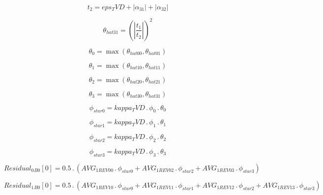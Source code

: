 \documentclass{article}
\begin{document}
\begin{dmath}t_{2} = eps_TVD + \left|{\alpha_{31}}\right| + \left|{\alpha_{32}}\right|\end{dmath}

\begin{dmath}\theta_{hat 31} = \left(\left|{\frac{t_{1}}{t_{2}}}\right| \right)^{2}\end{dmath}

\begin{dmath}\theta_{0} = \max\left(\theta_{hat 00}, \theta_{hat 01}\right)\end{dmath}

\begin{dmath}\theta_{1} = \max\left(\theta_{hat 10}, \theta_{hat 11}\right)\end{dmath}

\begin{dmath}\theta_{2} = \max\left(\theta_{hat 20}, \theta_{hat 21}\right)\end{dmath}

\begin{dmath}\theta_{3} = \max\left(\theta_{hat 30}, \theta_{hat 31}\right)\end{dmath}

\begin{dmath}\phi_{star 0} = kappa_TVD \,.\, \phi_{0} \,.\, \theta_{0}\end{dmath}

\begin{dmath}\phi_{star 1} = kappa_TVD \,.\, \phi_{1} \,.\, \theta_{1}\end{dmath}

\begin{dmath}\phi_{star 2} = kappa_TVD \,.\, \phi_{2} \,.\, \theta_{2}\end{dmath}

\begin{dmath}\phi_{star 3} = kappa_TVD \,.\, \phi_{3} \,.\, \theta_{3}\end{dmath}

\begin{dmath}{Residual_{0}{_{B0}}}[{0}] = 0.5 \,.\, \left(AVG_{1 REV 00} \,.\, \phi_{star 0} + AVG_{1 REV 02} \,.\, \phi_{star 2} + AVG_{1 REV 03} \,.\, \phi_{star 3}\right)\end{dmath}

\begin{dmath}{Residual_{1}{_{B0}}}[{0}] = 0.5 \,.\, \left(AVG_{1 REV 10} \,.\, \phi_{star 0} + AVG_{1 REV 11} \,.\, \phi_{star 1} + AVG_{1 REV 12} \,.\, \phi_{star 2} + AVG_{1 REV 13} \,.\, \phi_{star 3}\right)\end{dmath}
\end{document}
